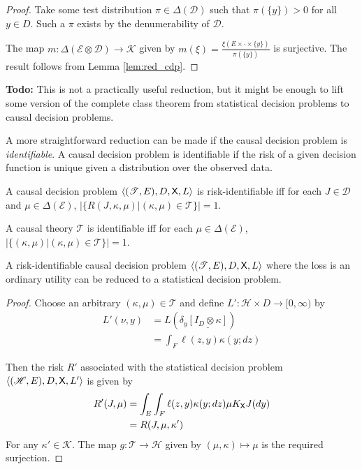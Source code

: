 \begin{proof}
Take some test distribution $\pi\in \Delta(\mathcal{D})$ such that $\pi(\{y\})>0$ for all $y\in D$. Such a $\pi$ exists by the denumerability of $\mathcal{D}$.

The map $m:\Delta(\mathcal{E}\otimes\mathcal{D})\to \mathscr{K}$ given by $m(\xi) = \frac{\xi(E\times \cdot\times \{y\})}{\pi(\{y\})}$ is surjective. The result follows from Lemma \ref{lem:red_cdp}.

\end{proof}

\textbf{Todo: }This is not a practically useful reduction, but it might be enough to lift some version of the complete class theorem from statistical decision problems to causal decision problems.

A more straightforward reduction can be made if the causal decision problem is \emph{identifiable}. A causal decision problem is identifiable if the risk of a given decision function is unique given a distribution over the observed data.

\begin{definition}[Identifiability]
A causal decision problem $\langle (\mathscr{T}, E), D, \mathsf{X}, L \rangle$ is risk-identifiable iff for each $J\in \mathscr{D}$ and $\mu\in \Delta(\mathcal{E})$, $|\{R(J,\kappa,\mu)|(\kappa,\mu)\in \mathscr{T}\}|=1$.

A causal theory $\mathscr{T}$ is identifiable iff for each $\mu\in \Delta(\mathcal{E})$, $|\{(\kappa,\mu)|(\kappa,\mu)\in\mathscr{T}\}|=1$.
\end{definition}

\begin{theorem}
A risk-identifiable causal decision problem $\langle (\mathscr{T}, E), D, \mathsf{X}, L \rangle$ where the loss is an ordinary utility can be reduced to a statistical decision problem.
\end{theorem}

\begin{proof}


Choose an arbitrary $(\kappa,\mu)\in\mathscr{T}$ and define $L':\mathscr{H}\times D\to [0,\infty)$ by
\begin{align}
    L'(\nu,y) &= L(\delta_y\underline{[I_D\otimes \kappa]})\\
              &= \int_F \ell(z,y) \kappa(y;dz)
\end{align}

Then the risk $R'$ associated with the statistical decision problem $\langle (\mathscr{H},E),D,\mathsf{X},L'\rangle$ is given by 
\begin{align}
    R'(J,\mu) &= \int_E \int_F \ell(z,y)  \kappa (y;dz) \mu K_{\mathsf{X}} J(dy)\\
              &= R(J,\mu,\kappa')
\end{align}
For any $\kappa'\in\mathscr{K}$. The map $g:\mathscr{T}\to\mathscr{H}$ given by $(\mu,\kappa)\mapsto \mu$ is the required surjection.
\end{proof}


